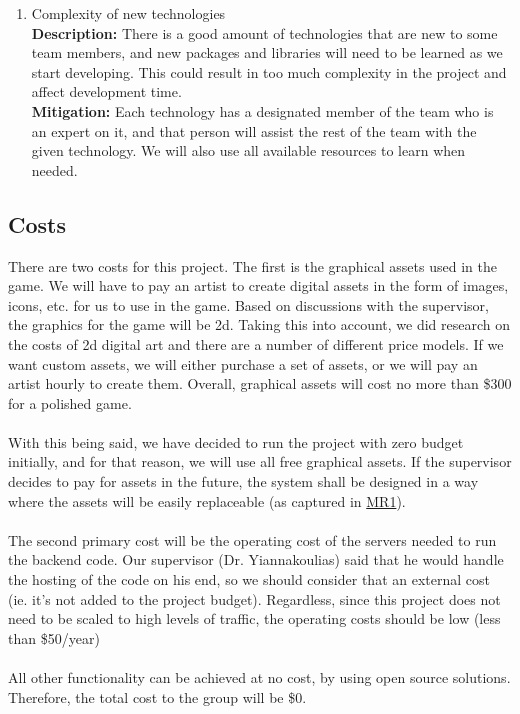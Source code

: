 \documentclass{article}
\begin{document}
\begin{enumerate}[{R}1.]
    \item Complexity of new technologies
    \\ \textbf{Description:} There is a good amount of technologies that are new to some team members, and new packages and libraries will need to be learned as we start developing. This could result in too much complexity in the project and affect development time.
    \\ \textbf{Mitigation:} Each technology has a designated member of the team who is an expert on it, and that person will assist the rest of the team with the given technology. We will also use all available resources to learn when needed.
\end{enumerate}

\subsection{Costs}
There are two costs for this project. The first is the graphical assets used in the game. We will have to pay an artist to create digital assets in the form of images, icons, etc. for us to use in the game. Based on discussions with the supervisor, the graphics for the game will be 2d. Taking this into account, we did research on the costs of 2d digital art and there are a number of different price models. If we want custom assets, we will either purchase a set of assets, or we will pay an artist hourly to create them. Overall, graphical assets will cost no more than \$300 for a polished game. 
\\ \\
With this being said, we have decided to run the project with zero budget initially, and for that reason, we will use all free graphical assets. If the supervisor decides to pay for assets in the future, the system shall be designed in a way where the assets will be easily replaceable (as captured in \hyperref[MR1]{MR1}).
\\ \\
The second primary cost will be the operating cost of the servers needed to run the backend code. Our supervisor (Dr. Yiannakoulias) said that he would handle the hosting of the code on his end, so we should consider that an external cost (ie. it's not added to the project budget). Regardless, since this project does not need to be scaled to high levels of traffic, the operating costs should be low (less than \$50/year)
\\ \\
All other functionality can be achieved at no cost, by using open source solutions. Therefore, the total cost to the group will be \$0.
\end{document}

